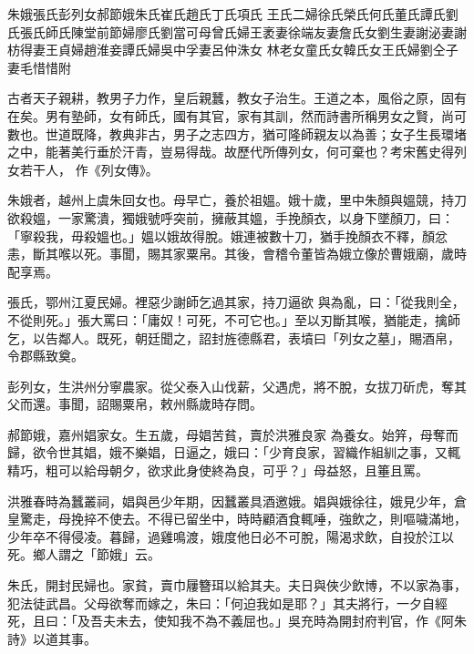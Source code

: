 
\begin{pinyinscope}

 朱娥張氏彭列女郝節娥朱氏崔氏趙氏丁氏項氏
 王氏二婦徐氏榮氏何氏董氏譚氏劉氏張氏師氏陳堂前節婦廖氏劉當可母曾氏婦王袤妻徐端友妻詹氏女劉生妻謝泌妻謝枋得妻王貞婦趙淮妾譚氏婦吳中孚妻呂仲洙女
 林老女童氏女韓氏女王氏婦劉仝子妻毛惜惜附



 古者天子親耕，教男子力作，皇后親蠶，教女子治生。王道之本，風俗之原，固有在矣。男有塾師，女有師氏，國有其官，家有其訓，然而詩書所稱男女之賢，尚可數也。世道既降，教典非古，男子之志四方，猶可隆師親友以為善；女子生長環堵之中，能著美行垂於汗青，豈易得哉。故歷代所傳列女，何可棄也？考宋舊史得列女若干人，
 作《列女傳》。



 朱娥者，越州上虞朱回女也。母早亡，養於祖媼。娥十歲，里中朱顏與媼競，持刀欲殺媼，一家驚潰，獨娥號呼突前，擁蔽其媼，手挽顏衣，以身下墜顏刀，曰：「寧殺我，毋殺媼也。」媼以娥故得脫。娥連被數十刀，猶手挽顏衣不釋，顏忿恚，斷其喉以死。事聞，賜其家粟帛。其後，會稽令董皆為娥立像於曹娥廟，歲時配享焉。



 張氏，鄂州江夏民婦。裡惡少謝師乞過其家，持刀逼欲
 與為亂，曰：「從我則全，不從則死。」張大罵曰：「庸奴！可死，不可它也。」至以刃斷其喉，猶能走，擒師乞，以告鄰人。既死，朝廷聞之，詔封旌德縣君，表墳曰「列女之墓」，賜酒帛，令郡縣致奠。



 彭列女，生洪州分寧農家。從父泰入山伐薪，父遇虎，將不脫，女拔刀斫虎，奪其父而還。事聞，詔賜粟帛，敕州縣歲時存問。



 郝節娥，嘉州娼家女。生五歲，母娼苦貧，賣於洪雅良家
 為養女。始笄，母奪而歸，欲令世其娼，娥不樂娼，日逼之，娥曰：「少育良家，習織作組紃之事，又輒精巧，粗可以給母朝夕，欲求此身使終為良，可乎？」母益怒，且箠且罵。



 洪雅春時為蠶叢祠，娼與邑少年期，因蠶叢具酒邀娥。娼與娥徐往，娥見少年，倉皇驚走，母挽捽不使去。不得已留坐中，時時顧酒食輒唾，強飲之，則嘔噦滿地，少年卒不得侵凌。暮歸，過雞鳴渡，娥度他日必不可脫，陽渴求飲，自投於江以死。鄉人謂之「節娥」云。



 朱氏，開封民婦也。家貧，賣巾屨簪珥以給其夫。夫日與俠少飲博，不以家為事，犯法徒武昌。父母欲奪而嫁之，朱曰：「何迫我如是耶？」其夫將行，一夕自經死，且曰：「及吾夫未去，使知我不為不義屈也。」吳充時為開封府判官，作《阿朱詩》以道其事。




\end{pinyinscope}
